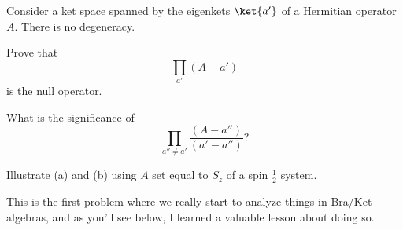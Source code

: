 \begin{question}

  Consider a ket space spanned by the eigenkets ${\ket{a'}}$ of a
  Hermitian operator $A$.  There is no degeneracy.

  \begin{questionpart}
    Prove that
    \begin{equation*}
      \prod_{a'}(A - a')
    \end{equation*}
    is the null operator.
  \end{questionpart}

  \begin{questionpart}
    What is the significance of
    \begin{equation*}
      \prod_{a'' \ne a'}\frac{(A-a'')}{(a'-a'')}?
    \end{equation*}
  \end{questionpart}

  \begin{questionpart}
    Illustrate (a) and (b) using $A$ set equal to $S_z$ of a spin
    $\frac 1 2$ system.
  \end{questionpart}

\end{question}

\begin{purpose}
  This is the first problem where we really start to analyze things in
  Bra/Ket algebras, and as you'll see below, I learned a valuable
  lesson about doing so.
\end{purpose}


